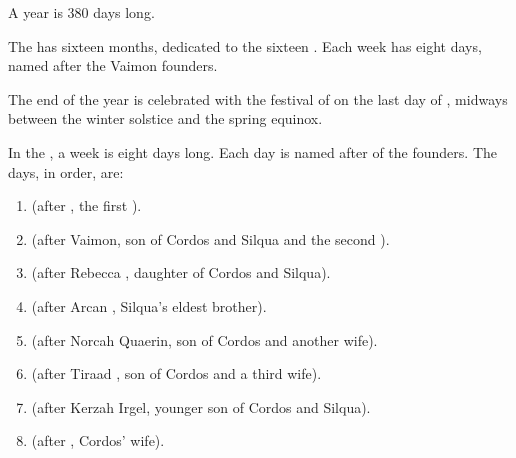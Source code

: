 \begin{gloss}
A year is 380 days long. 

The \ImperialCalendar{} has sixteen months, dedicated to the sixteen . 
Each week has eight days, named after the Vaimon founders. 

The end of the year is celebrated with the festival of \Camaire{} on the last day of \Gamishiel{}, midways between the winter solstice and the spring equinox. 






\begin{subgloss}
  \begin{comment}
  \subparagraph{days}
  \end{comment}
  \index{\Corjin}
  \index{\Zetherab}
  \index{\Rebecab}
  \index{\Arcab}
  \index{\Norquin}
  \index{\Tirjin}
  \index{\Kerzab}
  \index{\Siljin}
  In the , a week is eight days long. 
  Each day is named after of the  founders.
  The days, in order, are:
  
  \begin{enumerate}
    \item 
      \Corjin{} (after , the first \VaimonCaliph).
    \item 
      \Zetherab{} (after \Zether Vaimon, son of Cordos and Silqua and the second \caliph).
    \item 
      \Rebecab{} (after Rebecca , daughter of Cordos and Silqua).
    \item 
      \Arcab{} (after Arcan \Delaen, Silqua's eldest brother).
    \item 
      \Norquin{} (after Norcah Quaerin, son of Cordos and another wife).
    \item 
      \Tirjin{} (after Tiraad , son of Cordos and a third wife).
    \item 
      \Kerzab{} (after Kerzah Irgel, younger son of Cordos and Silqua).
    \item 
      \Siljin{} (after , Cordos' wife). 
  \end{enumerate}
  
  
  
  
  
  
  
  \begin{comment}
  \subparagraph{months}
  \end{comment}
  

\end{subgloss}
\end{gloss}
